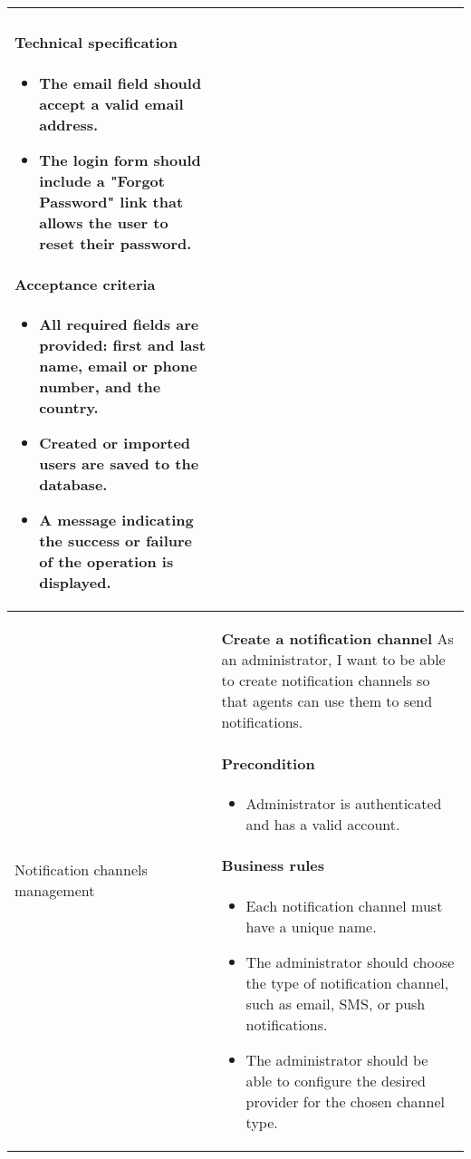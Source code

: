 \begin{longtable}{ | m{} | m{} | }
    \paragraph*{Technical specification} \mbox{} \newline
    \begin{itemize}
        \item The email field should accept a valid email address.
        \item The login form should include a "Forgot Password" link that allows the user to reset their password.

    \end{itemize}
    \paragraph*{Acceptance criteria} \mbox{} \newline
    \begin{itemize}
        \item All required fields are provided: first and last name, email or phone number, and the country.
        \item Created or imported users are saved to the database.
        \item A message indicating the success or failure of the operation is displayed.
    \end{itemize}                                                                                                                                                                   \\
    \hline
    Notification \newline channels \newline management & \textbf{Create a notification channel} \newline As an administrator, I want to be able to create notification channels so that agents can use them to send notifications.
    \paragraph*{Precondition} \mbox{} \newline
    \begin{itemize}
        \item Administrator is authenticated and has a valid account.
    \end{itemize}
    \paragraph*{Business rules} \mbox{} \newline
    \begin{itemize}
        \item Each notification channel must have a unique name.
        \item The administrator should choose the type of notification channel, such as email, SMS, or push notifications.
        \item The administrator should be able to configure the desired provider for the chosen channel type.
    \end{itemize}

\end{longtable}
